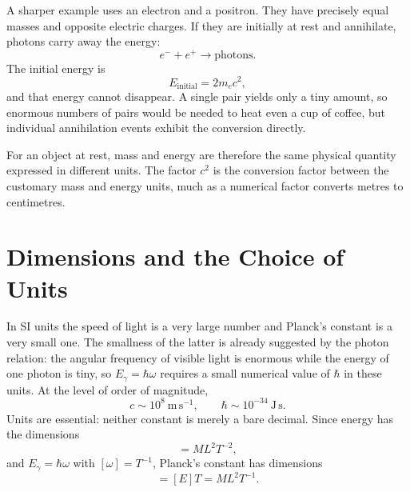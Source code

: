A sharper example uses an electron and a positron. They have precisely equal masses and opposite electric charges. If they are initially at rest and annihilate, photons carry away the energy:
\begin{equation}
e^-+e^+\longrightarrow \text{photons}.
\end{equation}
The initial energy is
\begin{equation}
E_{\mathrm{initial}}=2m_e c^2,
\end{equation}
and that energy cannot disappear. A single pair yields only a tiny amount, so enormous numbers of pairs would be needed to heat even a cup of coffee, but individual annihilation events exhibit the conversion directly.

For an object at rest, mass and energy are therefore the same physical quantity expressed in different units. The factor \(c^2\) is the conversion factor between the customary mass and energy units, much as a numerical factor converts metres to centimetres.

\begin{classroomqa}
\end{classroomqa}

\section{Dimensions and the Choice of Units}

In SI units the speed of light is a very large number and Planck's constant is a very small one. The smallness of the latter is already suggested by the photon relation: the angular frequency of visible light is enormous while the energy of one photon is tiny, so \(E_\gamma=\hbar\omega\) requires a small numerical value of \(\hbar\) in these units. At the level of order of magnitude,
\begin{equation}
c\sim 10^8\ \mathrm{m\,s^{-1}},
\qquad
\hbar\sim 10^{-34}\ \mathrm{J\,s}.
\end{equation}
Units are essential: neither constant is merely a bare decimal. Since energy has the dimensions
\begin{equation}
[E]=M L^2 T^{-2},
\end{equation}
and \(E_\gamma=\hbar\omega\) with \([\omega]=T^{-1}\), Planck's constant has dimensions
\begin{equation}
[\hbar]=[E]T=M L^2 T^{-1}.
\end{equation}

